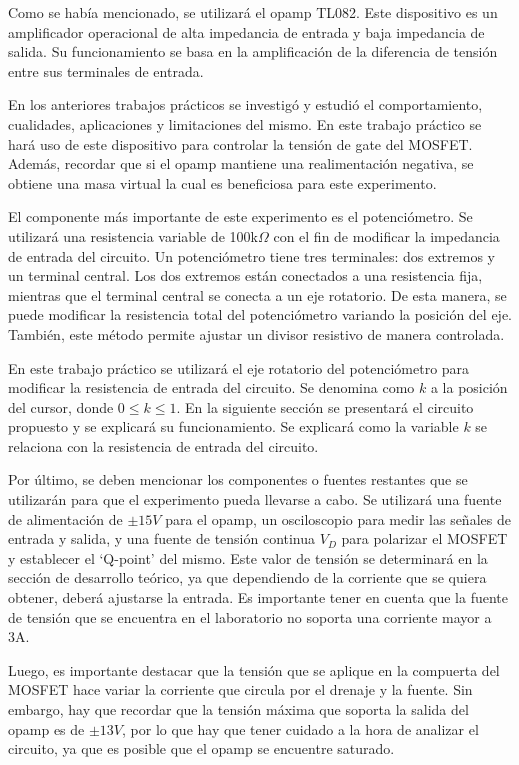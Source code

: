 \documentclass[12pt,oneside,a4paper]{article}
\begin{document}
Como se había mencionado, se utilizará el opamp TL082. Este dispositivo es un amplificador operacional 
de alta impedancia de entrada y baja impedancia de salida. Su funcionamiento se basa en la amplificación 
de la diferencia de tensión entre sus terminales de entrada. 

En los anteriores trabajos prácticos se investigó y estudió el comportamiento, cualidades, 
aplicaciones y limitaciones del mismo. En este trabajo práctico se hará uso de este dispositivo 
para controlar la tensión de gate del MOSFET. Además, recordar que si el opamp mantiene una 
realimentación negativa, se obtiene una masa virtual la cual es beneficiosa para este experimento.

\newpage 

El componente más importante de este experimento es el potenciómetro. Se utilizará una resistencia variable 
de 100k$\Omega$ con el fin de modificar la impedancia de entrada del circuito. 
Un potenciómetro tiene tres terminales: dos extremos y un terminal central. Los dos extremos están
conectados a una resistencia fija, mientras que el terminal central se conecta a un eje rotatorio. 
De esta manera, se puede modificar la resistencia total del potenciómetro variando la posición del eje. 
También, este método permite ajustar un divisor resistivo de manera controlada. 

En este trabajo práctico se utilizará el eje rotatorio del potenciómetro para modificar la 
resistencia de entrada del circuito. Se denomina como $k$ a la posición del cursor, donde $0 \leq k \leq 1$.
En la siguiente sección se presentará el circuito propuesto y se explicará su funcionamiento. Se 
explicará como la variable $k$ se relaciona con la resistencia de entrada del circuito.

Por último, se deben mencionar los componentes o fuentes restantes que se utilizarán para que el 
experimento pueda llevarse a cabo. Se utilizará una fuente de alimentación de $\pm 15V$ para el opamp, un 
osciloscopio para medir las señales de entrada y salida, y una fuente de tensión continua $V_D$ para
polarizar el MOSFET y establecer el \enquote*{Q-point} del mismo.
Este valor de tensión se determinará en la sección de desarrollo teórico, ya que dependiendo de la corriente 
que se quiera obtener, deberá ajustarse la entrada. Es importante tener en cuenta 
que la fuente de tensión que se encuentra en el laboratorio no soporta una corriente mayor a 3A. 

Luego, es importante destacar que la tensión que se aplique en la compuerta del MOSFET 
hace variar la corriente que circula por el drenaje y la fuente. Sin embargo, hay que recordar que 
la tensión máxima que soporta la salida del opamp es de $\pm 13V$, por lo que hay que tener cuidado 
a la hora de analizar el circuito, ya que es posible que el opamp se encuentre saturado.
\end{document}
